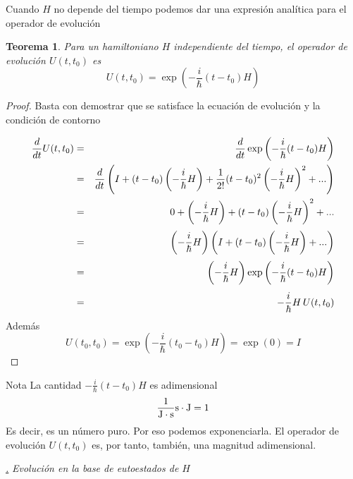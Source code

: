 \documentclass[a4paper,11pt]{book} %
\newtheorem{teorema_contador}{Teorema}
\newcommand{\Teorema}[1]{
		\begin{mybox_gray2}{}
			\begin{teorema_contador}
				 #1 
			\end{teorema_contador} 
		\end{mybox_gray2}
	}
\numberwithin{equation}{chapter}
\def\subsubiContadorIt{\par\addtocounter{subsubsection}{1}\underline{\it\thesubsubsection.}\hskip0.5cm \setcounter{subsubsubsectionIt}{0}}
\newcommand{\SubsubiIt}[1]{
		\subsubiContadorIt \textit{#1}
	}
\newcounter{subsubsubsectionIt}[subsubsection]
\begin{document}
Cuando $H$ no depende del tiempo podemos dar una expresión analítica para el operador de evolución
	\Teorema{
	Para un hamiltoniano $H$ independiente del tiempo, el operador de evolución $U(t,t_0)$ es
		\begin{equation}
		U(t,t_0) = \exp\left({-\frac{i}{\hbar} (t-t_0)H}\right)
		\end{equation}
	}
	\begin{proof}
	Basta con demostrar que se satisface la ecuación de evolución y la condición de contorno

\begin{eqnarray}
\frac{d}{dt}U(t,t_0) &=& \frac{d}{dt} \exp\left({-\frac{i}{\hbar} (t-t_0)H}\right)
    \nonumber\\ \rule{0mm}{6mm}
   &=& \frac{d}{dt}\left( I +(t-t_0)\left(-\frac{i}{\hbar} H\right) + \frac{1}{2!} 
    (t-t_0)^2\left(-\frac{i}{\hbar} H\right)^2  + ...\right) \nonumber\\ \rule{0mm}{6mm}
    &=& 0 +  \left(-\frac{i}{\hbar} H\right) +  (t-t_0)\left(-\frac{i}{\hbar} H\right)^2  + ... \nonumber\\ \rule{0mm}{6mm}
&=&  \left(-\frac{i}{\hbar} H\right)\left( I + (t-t_0) \left(-\frac{i}{\hbar} H\right) + ...\right)
  \nonumber \\ \rule{0mm}{6mm} 
&=& \left(-\frac{i}{\hbar} H\right) \exp\left({-\frac{i}{\hbar} (t-t_0)H}\right)    \nonumber\\ \rule{0mm}{6mm}
&=& -\frac{i}{\hbar} H \,  U(t,t_0)
\end{eqnarray}
Además
	\begin{equation}
	U(t_0,t_0) =  \exp\left({-\frac{i}{\hbar} (t_0-t_0)H}\right)=\exp(0) = I
	\end{equation}
	\end{proof}
	
	\begin{mybox_blue}{Nota}
	La cantidad ${-\frac{i}{\hbar} (t-t_0) H }$ es adimensional
	\begin{equation}
	\frac{1}{\hbox{J}\cdot \hbox{s}}\hbox{s}\cdot\hbox{J} = 1
	\end{equation}
	Es decir, es un número puro. Por eso podemos exponenciarla. El operador de evolución $U(t,t_0)$ es, por tanto, también, una magnitud adimensional.
	\end{mybox_blue}

		\SubsubiIt{Evolución en la base de eutoestados de $H$}
\end{document}
